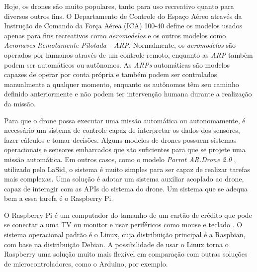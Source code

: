 

Hoje, os drones são muito populares, tanto para uso recreativo quanto para diversos outros fins. O Departamento de Controle do Espaço Aéreo através da Instrução de Comando da Força Aérea (ICA) 100-40 \cite{CEA2018} define os modelos usados apenas para fins recreativos como \textit{aeromodelos} e os outros modelos como \textit{Aeronaves Remotamente Pilotada - ARP}. Normalmente, os \textit{aeromodelos} são operados por humanos através de um controle remoto, enquanto as \textit{ARP} também podem ser automáticos ou autônomos. As \textit{ARPs} automáticas são modelos capazes de operar por conta própria e também podem ser controlados manualmente a qualquer momento, enquanto os autônomos têm seu caminho definido anteriormente e não podem ter intervenção humana durante a realização da missão.

Para que o drone possa executar uma missão automática ou autonomamente, é necessário um sistema de controle capaz de interpretar os dados dos sensores, fazer cálculos e tomar decisões. Alguns modelos de drones possuem sistemas operacionais e sensores embarcados que são suficientes para que se projete uma missão automática. Em outros casos, como o modelo \textit{Parrot AR.Drone 2.0} \cite{Parrot2019a}, utilizado pelo LaSid, o sistema é muito simples para ser capaz de realizar tarefas mais complexas. Uma solução é adotar um sistema auxiliar acoplado ao drone, capaz de interagir com as APIs do sistema do drone. Um sistema que se adequa bem a essa tarefa é o Raspberry Pi.

O Raspberry Pi é um computador do tamanho de um cartão de crédito que pode se conectar a uma TV ou monitor e usar periféricos como mouse e teclado \cite{RPF2019a}. O sistema operacional padrão é o Linux, cuja distribuição principal é a Raspbian, com base na distribuição Debian. A possibilidade de usar o Linux torna o Raspberry uma solução muito mais flexível em comparação com outras soluções de microcontroladores, como o Arduino, por exemplo.

